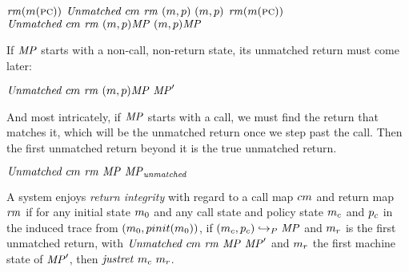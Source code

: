 \documentclass[acmsmall,review,anonymous]{acmart}\settopmatter{printfolios=true,printccs=false,printacmref=false}
\begin{document}
  \judgmenttwo{\(\callmap(\mach(\PCname)) = \bot\)}
           {\(\mathit{rm}(m(\textsc{pc}))\)}
      {\(\mathit{Unmatched}\ \callmap\ \retmap\ \mpstate{\mach}{\pol}\ 
        \mpstate{\mach}{\pol}\)}
  \judgmenttwo{\(\callmap(\mach(\PCname)) = \bot\)}
              {\(\mathit{rm}(m(\textsc{pc}))\)}
      {\(\mathit{Unmatched}\ \callmap\ \retmap\ \mpstate{\mach}{\pol}\MPT\ 
              \mpstate{\mach}{\pol}\MPT\)}

    If \(\mathit{MP}\) starts with a non-call, non-return state, its unmatched
    return must come later:

           {\(\mathit{Unmatched}\ \callmap\ \retmap\ 
            \mpstate{\mach}{\pol}\MPT\ \MPT'\)}

    And most intricately, if \(\mathit{MP}\) starts with a call, we must find the
    return that matches it, which will be the unmatched return once we step
    past the call. Then the first unmatched return beyond it is the true
    unmatched return.
    
            {\(\mathit{Unmatched}\ \callmap\ \retmap\ \MPT\ \MPT_{\mathit{unmatched}}\)}

    A system enjoys {\em return integrity} with regard to a call map
    \(cm\) and return map \(\mathit{rm}\) if for any initial state
    \(m_0\) and any call state and policy state \(m_c\) and \(p_c\)
    in the induced trace from \((m_0,pinit(m_0))\), if
    \((m_c,p_c) \hookrightarrow_P \mathit{MP}\) and \(m_r\) is the
    first unmatched return, with \(\mathit{Unmatched}\ \callmap\ \retmap\ \MPT
    \ \MPT'\) and \(m_r\) the first machine state of \(\mathit{MP}'\),
    then \(\mathit{justret}\ m_c\ m_r\).
\end{document}
